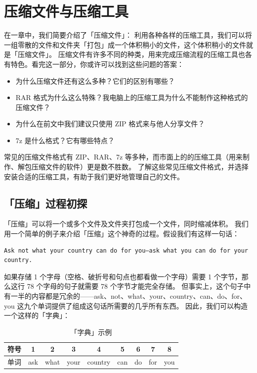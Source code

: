 \chapter{压缩文件与压缩工具}
\label{archive-formats-and-tools}

\begin{intro}
  在一章中，我们简要介绍了「压缩文件」：
  利用各种各样的压缩工具，我们可以将一组零散的文件和文件夹「打包」成一个体积稍小的文件，这个体积稍小的文件就是「压缩文件」。
  压缩文件有许多不同的种类，用来完成压缩流程的压缩工具也各有特色。看完这一部分，你或许可以找到这些问题的答案：
  \begin{itemize}
    \item 为什么压缩文件还有这么多种？它们的区别有哪些？
    \item RAR 格式为什么这么特殊？我电脑上的压缩工具为什么不能制作这种格式的压缩文件？
    \item 为什么在前文中我们建议只使用 ZIP 格式来与他人分享文件？
    \item 7z 是什么格式？它有哪些特点？
  \end{itemize}
\end{intro}

常见的压缩文件格式有 ZIP、RAR、7z 等多种，而市面上的的压缩工具（用来制作、解包压缩文件的软件）更是数不胜数。
了解这些常见压缩文件格式，并选择安装合适的压缩工具，有助于我们更好地管理自己的文件。

\section{「压缩」过程初探}

「压缩」可以将一个或多个文件及文件夹打包成一个文件，同时缩减体积。
我们用一个简单的例子来介绍「压缩」这个神奇的过程。假设我们有这样一句话：

\begin{verbatim}
Ask not what your country can do for you—ask what you can do for your country.
\end{verbatim}

如果存储 1 个字母（空格、破折号和句点也都看做一个字母）需要 1 个字节，那么这行 78 个字母的句子就需要 78 个字节才能完全存储。
但事实上，这个句子中有一半的内容都是冗余的——ask、not、what、your、country、can、do、for、you 这九个单词提供了组成这句话所需要的几乎所有东西。
因此，我们可以构造一个这样的「字典」：

\begin{table}[htb!]
  \centering\begin{tabular}{*{9}{c}}
    \toprule
    符号 & 1 & 2 & 3 & 4 & 5 & 6 & 7 & 8 \\
    \midrule
    单词 & ask & what & your & country & can & do & for & you \\
    \bottomrule
  \end{tabular}
  \caption{「字典」示例}
  \label{Compress_Dict}
\end{table}

